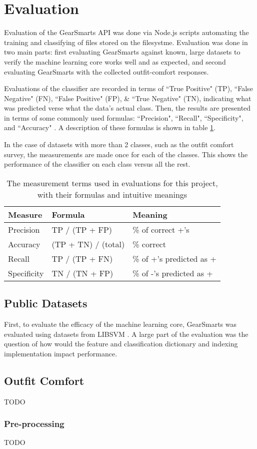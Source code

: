 \section{Evaluation}
\label{section:evaluation}
Evaluation of the GearSmarts API was done via Node.js scripts automating the training and classifying of files
stored on the filesystme. Evaluation was done in two main parts: first evaluating GearSmarts against known, large datasets
to verify the machine learning core works well and as expected, and second evaluating GearSmarts with the collected
outfit-comfort responses.

Evaluations of the classifier are recorded in terms of ``True Positive" (TP), ``False Negative" (FN), ``False Positive"
(FP), \& ``True Negative" (TN), indicating what was predicted verse what the data's actual class. Then, the results are
presented in terms of some commonly used formulas: ``Precision", ``Recall", ``Specificity", and ``Accuracy"
\cite{measures}. A description of these formulas is shown in table \ref{table:measures}.

In the case of datasets with more than 2 classes, such as the outfit comfort survey, the measurements are made once for
each of the classes. This shows the performance of the classifier on each class versus all the rest.

\begin{table}
    \begin{tabular}{lll}
        \hline
        \textbf{Measure} & \textbf{Formula} & \textbf{Meaning} \\ [0.5ex]
        \hline\hline
        Precision	& TP / (TP + FP) & \% of correct +'s \\
        Accuracy	& (TP + TN) / (total) & \% correct \\
        Recall 	    & TP / (TP + FN) & \% of +'s predicted as + \\
        Specificity	& TN / (TN + FP) & \% of -'s predicted as + \\
        \hline
    \end{tabular}
    \caption{The measurement terms used in evaluations for this project, with their formulas and intuitive meanings}
    \label{table:measures}
\end{table}

\subsection{Public Datasets}
\label{subsection:publicdatasets}
First, to evaluate the efficacy of the machine learning core, GearSmarts was evaluated using datasets from LIBSVM \cite{libsvm:datasets}.
A large part of the evaluation was the question of how would the feature and classification dictionary and indexing implementation
impact performance.

\subsection{Outfit Comfort}
TODO

\subsubsection{Pre-processing}
\label{subsection:preprocessing}

TODO